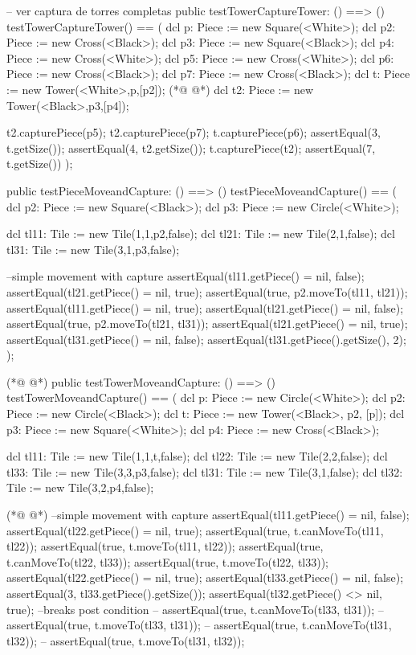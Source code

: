 \begin{vdmpp}[breaklines=true]
  
  -- ver captura de torres completas
  public testTowerCaptureTower: () ==> ()
  testTowerCaptureTower() == (
   dcl p: Piece := new Square(<White>);  
   dcl p2: Piece := new Cross(<Black>);
   dcl p3: Piece := new Square(<Black>);
   dcl p4: Piece := new Cross(<White>);
   dcl p5: Piece := new Cross(<White>);
   dcl p6: Piece := new Cross(<Black>);
   dcl p7: Piece := new Cross(<Black>);
   dcl t: Piece := new Tower(<White>,p,[p2]);
(*@
\label{testTowerMoveandCapture:289}
@*)
   dcl t2: Piece := new Tower(<Black>,p3,[p4]);
   
   t2.capturePiece(p5);
   t2.capturePiece(p7);
   t.capturePiece(p6);
   assertEqual(3, t.getSize());
   assertEqual(4, t2.getSize());
   t.capturePiece(t2);
   assertEqual(7, t.getSize())
  );  
  
  public testPieceMoveandCapture: () ==> ()
  testPieceMoveandCapture() == (
   dcl p2: Piece := new Square(<Black>);
   dcl p3: Piece := new Circle(<White>);
   
   dcl tl11: Tile := new Tile(1,1,p2,false);
   dcl tl21: Tile := new Tile(2,1,false);
   dcl tl31: Tile := new Tile(3,1,p3,false);
   
   --simple movement with capture
   assertEqual(tl11.getPiece() = nil, false);
   assertEqual(tl21.getPiece() = nil, true);
   assertEqual(true, p2.moveTo(tl11, tl21));
   assertEqual(tl11.getPiece() = nil, true);
   assertEqual(tl21.getPiece() = nil, false);
   assertEqual(true, p2.moveTo(tl21, tl31));
   assertEqual(tl21.getPiece() = nil, true);
   assertEqual(tl31.getPiece() = nil, false);
   assertEqual(tl31.getPiece().getSize(), 2);
  );
   
(*@
\label{GameCicleTest:321}
@*)
  public testTowerMoveandCapture: () ==> ()
  testTowerMoveandCapture() == (
   dcl p: Piece := new Circle(<White>);
   dcl p2: Piece := new Circle(<Black>);
   dcl t: Piece := new Tower(<Black>, p2, [p]);
   dcl p3: Piece := new Square(<White>);
   dcl p4: Piece := new Cross(<Black>);
   
   dcl tl11: Tile := new Tile(1,1,t,false);
   dcl tl22: Tile := new Tile(2,2,false);
   dcl tl33: Tile := new Tile(3,3,p3,false);
   dcl tl31: Tile := new Tile(3,1,false);
   dcl tl32: Tile := new Tile(3,2,p4,false);
   
(*@
\label{GameOverTest:335}
@*)
   --simple movement with capture
   assertEqual(tl11.getPiece() = nil, false);
   assertEqual(tl22.getPiece() = nil, true);
   assertEqual(true, t.canMoveTo(tl11, tl22));
   assertEqual(true, t.moveTo(tl11, tl22));
   assertEqual(true, t.canMoveTo(tl22, tl33));
   assertEqual(true, t.moveTo(tl22, tl33));
   assertEqual(tl22.getPiece() = nil, true);
   assertEqual(tl33.getPiece() = nil, false);
   assertEqual(3, tl33.getPiece().getSize());
   assertEqual(tl32.getPiece() <> nil, true);
   --breaks post condition
  -- assertEqual(true, t.canMoveTo(tl33, tl31));
  -- assertEqual(true, t.moveTo(tl33, tl31));
  -- assertEqual(true, t.canMoveTo(tl31, tl32));
  -- assertEqual(true, t.moveTo(tl31, tl32));
   

\end{vdmpp}
